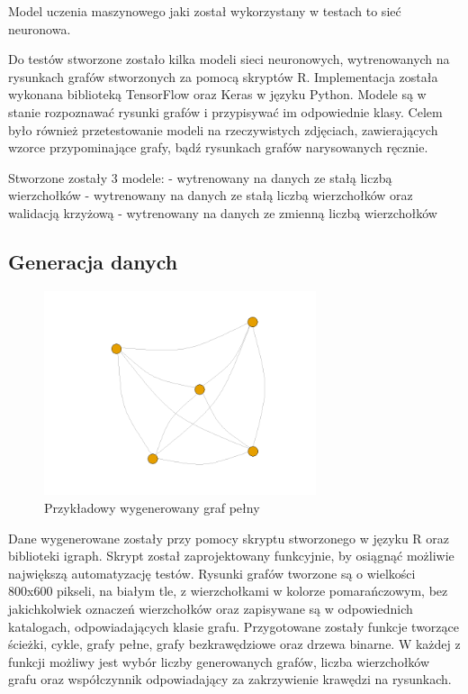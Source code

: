 Model uczenia maszynowego jaki został wykorzystany w testach to sieć neuronowa.

Do testów stworzone zostało kilka modeli sieci neuronowych,
wytrenowanych na rysunkach grafów stworzonych za pomocą skryptów R.
Implementacja została wykonana biblioteką TensorFlow oraz Keras w języku Python.
Modele są w stanie rozpoznawać rysunki grafów i przypisywać im odpowiednie klasy.
Celem było również przetestowanie modeli na rzeczywistych zdjęciach,
zawierających wzorce przypominające grafy, bądź rysunkach grafów narysowanych ręcznie.

Stworzone zostały 3 modele:
- wytrenowany na danych ze stałą liczbą wierzchołków
- wytrenowany na danych ze stałą liczbą wierzchołków oraz walidacją krzyżową
- wytrenowany na danych ze zmienną liczbą wierzchołków

\subsection{Generacja danych}

\begin{figure}[ht]
	\centering
	\includegraphics[height=6cm]{partials/images/graph_full.png}
	\caption{Przykładowy wygenerowany graf pełny}
	\label{Fig:tests-generation-1}
\end{figure}
\FloatBarrier

Dane wygenerowane zostały przy pomocy skryptu stworzonego w języku R oraz biblioteki igraph.
Skrypt został zaprojektowany funkcyjnie, by osiągnąć możliwie największą automatyzację testów.
Rysunki grafów tworzone są o wielkości 800x600 pikseli, na białym tle, z wierzchołkami w kolorze pomarańczowym,
bez jakichkolwiek oznaczeń wierzchołków oraz zapisywane są w odpowiednich katalogach, odpowiadających klasie grafu.
Przygotowane zostały funkcje tworzące ścieżki, cykle, grafy pełne, grafy bezkrawędziowe oraz drzewa binarne.
W każdej z funkcji możliwy jest wybór liczby generowanych grafów, liczba wierzchołków grafu
oraz współczynnik odpowiadający za zakrzywienie krawędzi na rysunkach.

